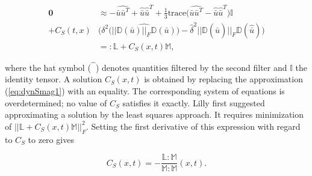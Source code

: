 \documentclass[a4paper, 11pt, twoside]{article}
\begin{document}
\begin{align}
\mathbf{0} &\approx - \widehat{\bar{u}\bar{u}^T} + \hat{\bar{u}} \hat{\bar{u}}^T + \frac{1}{3}\text{trace}\Big(\widehat{\bar{u}\bar{u}^T} - \hat{\bar{u}} \hat{\bar{u}}^T\Big) \mathbb{I} \label{eq:dynSmag1} \\ \nonumber
+ C_S(t,x) &\Bigg(\delta^2 \widehat{\Big(||\mathbb{D}(\bar{u})||_F \mathbb{D}(\bar{u})\Big)} - \hat{\delta}^2 ||\mathbb{D}(\hat{\bar{u}})||_F \mathbb{D}(\hat{\bar{u}})\Bigg) \\
&=: \label{eq:dynSmag2}\mathbb{L} + C_S(x,t) \mathbb{M},
\end{align}

where the hat symbol ($\hat{\phantom{h}}$) denotes quantities filtered by the second filter and $\mathbb{I}$ the identity tensor. A solution $C_S(x,t)$ is obtained by replacing the approximation (\ref{eq:dynSmag1}) with an equality. The corresponding system of equations is overdetermined; no value of $C_S$ satisfies it exactly. Lilly \cite{Lilly} first suggested approximating a solution by the least squares approach. It requires minimization of $||\mathbb{L} + C_S(x,t)\mathbb{M}||_F^2$. Setting the first derivative of this expression with regard to $C_S$ to zero gives 

\begin{equation} \label{eq:C_S}
    C_S(x,t) = - \frac{\mathbb{L}:\mathbb{M}}{\mathbb{M}:\mathbb{M}}(x,t).
\end{equation} 
\end{document}
